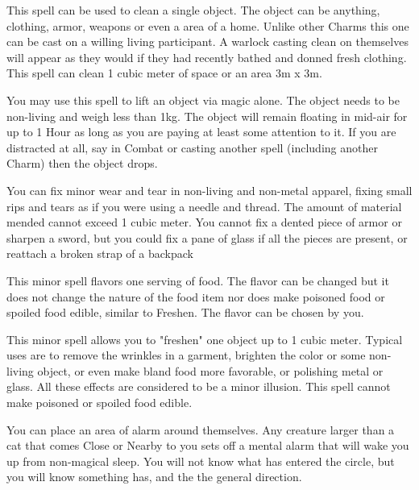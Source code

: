 {

This spell can be used to clean a single object. The object can be anything, clothing, armor, weapons or even a area of a home. Unlike other Charms this one can be cast on a willing living participant. A warlock casting clean on themselves will appear as they would if they had recently bathed and donned fresh clothing. This spell can clean 1 cubic meter of space or an area 3m x 3m. 


You may use this spell to lift an object via magic alone. The object needs to be non-living and weigh less than 1kg. The object will remain floating in mid-air for up to 1 Hour as long as you are paying at least some attention to it. If you are distracted at all, say in Combat or casting another spell (including another Charm) then the object drops. 




You can fix minor wear and tear in non-living and non-metal apparel, fixing small rips and tears as if you were using a needle and thread.  The amount of material mended cannot exceed 1 cubic meter.  You cannot fix a dented piece of armor or sharpen a sword, but you could fix a pane of glass if all the pieces are present, or reattach a broken strap of a backpack



This minor spell flavors one serving of food. The flavor can be changed but it does not change the nature of the food item nor does make poisoned food or spoiled food edible, similar to Freshen. The flavor can be chosen by you. 


This minor spell allows you to "freshen" one object up to 1 cubic meter. Typical uses are to remove the wrinkles in a garment, brighten the color or some non-living object, or even make bland food more favorable, or polishing metal or glass. All these effects are considered to be a minor illusion. This spell cannot make poisoned or spoiled food edible. 


You can place an area of alarm around themselves.  Any creature larger than a cat that comes Close or Nearby to you sets off a mental alarm that will wake you up from non-magical sleep.  You will not know what has entered the circle, but you will know something has, and the the general direction.

}

